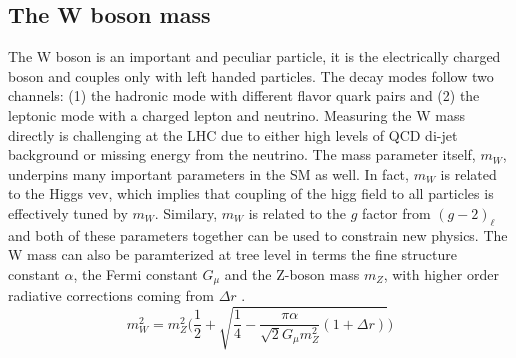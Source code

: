 

\subsection{The W boson mass}

The W boson is an important and peculiar particle, it is the electrically charged boson and couples only with left handed particles. The decay modes follow two channels: (1) the hadronic mode with different flavor quark pairs and (2) the leptonic mode with a charged lepton and neutrino. Measuring the W mass directly is challenging at the LHC due to either high levels of QCD di-jet background or missing energy from the neutrino. The mass parameter itself, $m_W$, underpins many important parameters in the SM as well. In fact, $m_W$ is related to the Higgs vev, which implies that coupling of the higg field to all particles is effectively tuned by $m_W$. Similary, $m_W$ is related to the $g$ factor from $(g-2)_\ell$ and both of these parameters together can be used to constrain new physics. The W mass can also be paramterized at tree level in terms the fine structure constant $\alpha$, the Fermi constant $G_\mu$ and the Z-boson mass $m_Z$, with higher order radiative corrections coming from $\Delta r$  \cite{Awramik:2003rn}.
\begin{equation}
\label{eq:mwequation}
m_W^2 = m_Z^2\Bigg(\frac{1}{2} + \sqrt{\frac{1}{4} - \frac{\pi\alpha}{\sqrt{2}G_\mu m_{Z}^2 }(1+\Delta r) } \Bigg)
\end{equation}

